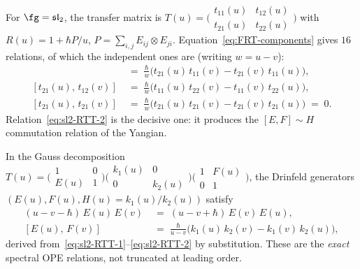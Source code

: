 For $\fg = \mathfrak{sl}_2$, the transfer matrix is
$T(u) = \bigl(\begin{smallmatrix}
t_{11}(u) & t_{12}(u) \\ t_{21}(u) & t_{22}(u)
\end{smallmatrix}\bigr)$
with $R(u) = 1 + \hbar P/u$,
$P = \sum_{i,j} E_{ij} \otimes E_{ji}$.
Equation~\eqref{eq:FRT-components} gives $16$ relations, of
which the independent ones are \textup(writing
$w = u - v$\textup):
\begin{align}
[t_{11}(u),\, t_{21}(v)]
&\;=\;
\frac{\hbar}{w}\bigl(t_{21}(u)\,t_{11}(v)
 - t_{21}(v)\,t_{11}(u)\bigr),
\label{eq:sl2-RTT-1}
\\[3pt]
[t_{21}(u),\, t_{12}(v)]
&\;=\;
\frac{\hbar}{w}\bigl(t_{11}(u)\,t_{22}(v)
 - t_{11}(v)\,t_{22}(u)\bigr),
\label{eq:sl2-RTT-2}
\\[3pt]
[t_{21}(u),\, t_{21}(v)]
&\;=\;
\frac{\hbar}{w}\bigl(t_{21}(u)\,t_{21}(v)
 - t_{21}(v)\,t_{21}(u)\bigr)
\;=\; 0.
\label{eq:sl2-RTT-3}
\end{align}
Relation~\eqref{eq:sl2-RTT-2} is the decisive one: it produces
the $[E, F] \sim H$ commutation relation of the Yangian.

In the Gauss decomposition
$T(u) = \bigl(\begin{smallmatrix} 1 & 0 \\ E(u) & 1
\end{smallmatrix}\bigr)
\bigl(\begin{smallmatrix} k_1(u) & 0 \\ 0 & k_2(u)
\end{smallmatrix}\bigr)
\bigl(\begin{smallmatrix} 1 & F(u) \\ 0 & 1
\end{smallmatrix}\bigr)$,
the Drinfeld generators $(E(u), F(u), H(u) = k_1(u)/k_2(u))$
satisfy
\begin{align}
(u - v - \hbar)\,E(u)\,E(v)
&\;=\;
(u - v + \hbar)\,E(v)\,E(u),
\label{eq:drinfeld-EE}
\\[3pt]
[E(u),\, F(v)]
&\;=\;
\frac{\hbar}{u - v}
\bigl(k_1(u)\,k_2(v) - k_1(v)\,k_2(u)\bigr),
\label{eq:drinfeld-EF}
\end{align}
derived from~\eqref{eq:sl2-RTT-1}--\eqref{eq:sl2-RTT-2} by
substitution. These are the \emph{exact} spectral OPE
relations, not truncated at leading order.

